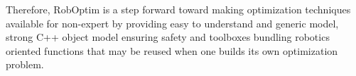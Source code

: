 \documentclass[conference,final,a4paper,twocolumn,9pt]{IEEEtran}
\begin{document}
Therefore, RobOptim is a step forward toward making optimization
techniques available for non-expert by providing easy to understand
and generic model, strong C++ object model ensuring safety and
toolboxes bundling robotics oriented functions that may be reused when
one builds its own optimization problem.




\end{document}
